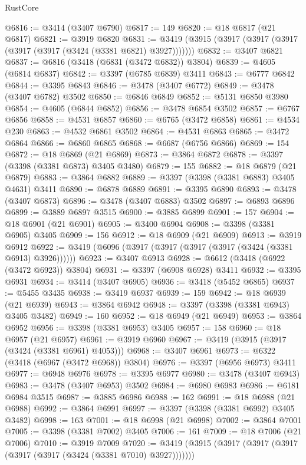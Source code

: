 \begin{lexlean}{RustCore}
\begin{coremodule}
@6816 := @3414 (@3407 @6790)
@6817 := 149
@6820 := @18 @6817 (@21 @6817)
@6821 := @3919 @6820
@6831 := @3419 (@3915 (@3917 (@3917 (@3917 (@3917 (@3917 (@3424 (@3381 @6821) @3927)))))))
@6832 := @3407 @6821
@6837 := @6816 (@3418 (@6831 (@3472 @6832)) @3804)
@6839 := @4605 (@6814 @6837)
@6842 := @3397 (@6785 @6839) @3411
@6843 := @6777 @6842
@6844 := @3395 @6843
@6846 := @3478 (@3407 @6772)
@6849 := @3478 (@3407 @6782) @3502
@6850 := @6846 @6849
@6852 := @5131 @6850 @3980
@6854 := @4605 (@6844 @6852)
@6856 := @3478 @6854 @3502
@6857 := @6767 @6856
@6858 := @4531 @6857
@6860 := @6765 (@3472 @6858)
@6861 := @4534 @230
@6863 := @4532 @6861 @3502
@6864 := @4531 @6863
@6865 := @3472 @6864
@6866 := @6860 @6865
@6868 := @6687 (@6756 @6866)
@6869 := 154
@6872 := @18 @6869 (@21 @6869)
@6873 := @3864 @6872
@6878 := @3397 (@3398 (@3381 @6873) @3405 @3480)
@6879 := 155
@6882 := @18 @6879 (@21 @6879)
@6883 := @3864 @6882
@6889 := @3397 (@3398 (@3381 @6883) @3405 @4631) @3411
@6890 := @6878 @6889
@6891 := @3395 @6890
@6893 := @3478 (@3407 @6873)
@6896 := @3478 (@3407 @6883) @3502
@6897 := @6893 @6896
@6899 := @3889 @6897 @3515
@6900 := @3885 @6899
@6901 := 157
@6904 := @18 @6901 (@21 @6901)
@6905 := @3400 @6904
@6908 := @3398 (@3381 @6905) @3405
@6909 := 156
@6912 := @18 @6909 (@21 @6909)
@6913 := @3919 @6912
@6922 := @3419 (@6096 (@3917 (@3917 (@3917 (@3917 (@3424 (@3381 @6913) @3926))))))
@6923 := @3407 @6913
@6928 := @6612 (@3418 (@6922 (@3472 @6923)) @3804)
@6931 := @3397 (@6908 @6928) @3411
@6932 := @3395 @6931
@6934 := @3414 (@3407 @6905)
@6936 := @3418 (@5452 @6865)
@6937 := @5455 @3435
@6938 := @3419 @6937
@6939 := 159
@6942 := @18 @6939 (@21 @6939)
@6943 := @3864 @6942
@6948 := @3397 (@3398 (@3381 @6943) @3405 @3482)
@6949 := 160
@6952 := @18 @6949 (@21 @6949)
@6953 := @3864 @6952
@6956 := @3398 (@3381 @6953) @3405
@6957 := 158
@6960 := @18 @6957 (@21 @6957)
@6961 := @3919 @6960
@6967 := @3419 (@3915 (@3917 (@3424 (@3381 @6961) @4053)))
@6968 := @3407 @6961
@6973 := @6322 (@3418 (@6967 (@3472 @6968)) @3804)
@6976 := @3397 (@6956 @6973) @3411
@6977 := @6948 @6976
@6978 := @3395 @6977
@6980 := @3478 (@3407 @6943)
@6983 := @3478 (@3407 @6953) @3502
@6984 := @6980 @6983
@6986 := @6181 @6984 @3515
@6987 := @3885 @6986
@6988 := 162
@6991 := @18 @6988 (@21 @6988)
@6992 := @3864 @6991
@6997 := @3397 (@3398 (@3381 @6992) @3405 @3482)
@6998 := 163
@7001 := @18 @6998 (@21 @6998)
@7002 := @3864 @7001
@7005 := @3398 (@3381 @7002) @3405
@7006 := 161
@7009 := @18 @7006 (@21 @7006)
@7010 := @3919 @7009
@7020 := @3419 (@3915 (@3917 (@3917 (@3917 (@3917 (@3917 (@3424 (@3381 @7010) @3927)))))))

\end{coremodule}
\end{lexlean}
